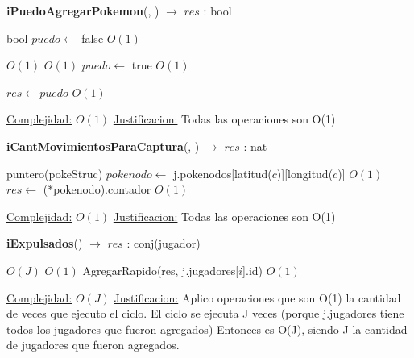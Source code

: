 \begin{Algoritmos}

\begin{algorithm}[H]
{\textbf{iPuedoAgregarPokemon}(, ) $\to$ $res$ : bool}
\begin{algorithmic}[1]

\State bool $puedo \gets$ false  \Comment $O(1)$

   \Comment $O(1)$
       \Comment $O(1)$
        \State $puedo \gets$ true        \Comment $O(1)$
    \EndIf
\EndIf

\State $res \gets puedo$  \Comment $O(1)$

\medskip
\State \underline{Complejidad:} $O(1)$
\State \underline{Justificacion:} Todas las operaciones son O(1)

\end{algorithmic}
\end{algorithm}



\begin{algorithm}[H]
{\textbf{iCantMovimientosParaCaptura}(, ) $\to$ $res$ :    nat}
\begin{algorithmic}[1]

\State puntero(pokeStruc) $pokenodo \gets$ j.pokenodos[latitud($c$)][longitud($c$)] \Comment $O(1)$
\State $res \gets$ (*pokenodo).contador  \Comment $O(1)$

\medskip
\State \underline{Complejidad:} $O(1)$
\State \underline{Justificacion:} Todas las operaciones son O(1)

\end{algorithmic}
\end{algorithm}



\begin{algorithm}[H]
{\textbf{iExpulsados}() $\to$ $res$ : conj(jugador)}
\begin{algorithmic}[1]

   \Comment $O(J)$
       \Comment $O(1)$
        AgregarRapido(res, j.jugadores[$i$].id)  \Comment $O(1)$        
    \EndIf
\EndFor

\medskip
\State \underline{Complejidad:} $O(J)$
\State \underline{Justificacion:} Aplico operaciones que son O(1) la cantidad de veces que ejecuto el ciclo. El ciclo se ejecuta J veces (porque j.jugadores tiene todos los jugadores que fueron agregados) Entonces es O(J), siendo J la cantidad de jugadores que fueron agregados.


\end{algorithmic}
\end{algorithm}
\end{Algoritmos}
